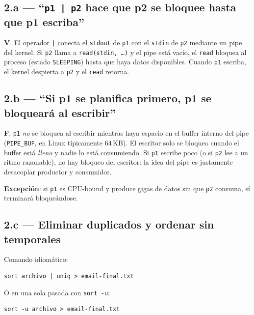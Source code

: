 \documentclass[11pt,a4paper]{article}
\begin{document}
\subsection*{2.a --- ``\texttt{p1 | p2} hace que p2 se bloquee hasta que p1 escriba''}

\begin{respuesta}
\textbf{V}. El operador \texttt{|} conecta el \texttt{stdout} de
\texttt{p1} con el \texttt{stdin} de \texttt{p2} mediante un pipe del
kernel. Si \texttt{p2} llama a \texttt{read(stdin, \ldots)} y el pipe
está vacío, el \texttt{read} bloquea al proceso (estado
\texttt{SLEEPING}) hasta que haya datos disponibles. Cuando \texttt{p1}
escriba, el kernel despierta a \texttt{p2} y el \texttt{read} retorna.
\end{respuesta}

\subsection*{2.b --- ``Si p1 se planifica primero, p1 se bloqueará al escribir''}

\begin{respuesta}
\textbf{F}. \texttt{p1} \emph{no} se bloquea al escribir mientras
haya espacio en el buffer interno del pipe (\texttt{PIPE\_BUF}, en
Linux típicamente $64$\,KB). El escritor solo se bloquea cuando el
buffer está \emph{lleno} y nadie lo está consumiendo. Si \texttt{p1}
escribe poco (o si \texttt{p2} lee a un ritmo razonable), no hay
bloqueo del escritor: la idea del pipe es justamente desacoplar
productor y consumidor.

\textbf{Excepción}: si \texttt{p1} es CPU-bound y produce gigas de
datos sin que \texttt{p2} consuma, sí terminará bloqueándose.
\end{respuesta}

\subsection*{2.c --- Eliminar duplicados y ordenar sin temporales}

Comando idiomático:

\begin{lstlisting}[style=shellstyle]
sort archivo | uniq > email-final.txt
\end{lstlisting}

\quad O en una sola pasada con \texttt{sort -u}:

\begin{lstlisting}[style=shellstyle]
sort -u archivo > email-final.txt
\end{lstlisting}
\end{document}
